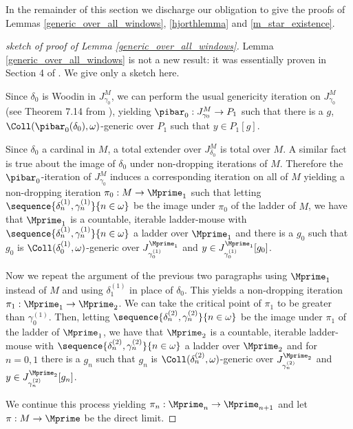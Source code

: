 \documentclass[oneside,12pt]{amsart}
\begin{document}
In the remainder of this section we discharge our obligation to give the proofs of
Lemmas \ref{generic_over_all_windows}, \ref{hjorthlemma} and
\ref{m_star_existence}.

\begin{proof}[sketch of proof of Lemma \ref{generic_over_all_windows}]
Lemma \ref{generic_over_all_windows} is not a new result: it was essentially
proven in Section 4 of \cite{Mouse_Sets}. We give only a sketch here.

Since $\delta_0$ is Woodin in $J^M_{\gamma_0}$,
we can perform the usual genericity iteration on $J^M_{\gamma_0}$
(see Theorem 7.14 from \cite{OutlineOfInnerModelTheory}), yielding
$\pibar_0:J^M_{\gamma_0}\to P_1$ such that
there is a $g$, $\Coll(\pibar_0(\delta_0),\omega)$-generic over $P_1$ such that $y\in P_1[g]$.

Since $\delta_0$ a cardinal in $M$, a total extender over $J^M_{\delta_0}$ is total
over $M$. A similar fact is true about the image of $\delta_0$ under non-dropping
iterations of $M$.
Therefore the $\pibar_0$-iteration of $J^M_{\gamma_0}$ induces a corresponding iteration on all of $M$
yielding a non-dropping iteration $\pi_0:M\to \Mprime_1$ such that
letting $\sequence{\delta^{(1)}_n,\gamma^{(1)}_n}{n\in\omega}$ be the image under $\pi_0$
of the ladder of $M$, we have that $\Mprime_1$ is a countable, iterable ladder-mouse
with $\sequence{\delta^{(1)}_n,\gamma^{(1)}_n}{n\in\omega}$ a ladder over $\Mprime_1$
and there is a $g_0$ such that $g_0$
is $\Coll(\delta^{(1)}_0,\omega)$-generic over
$J^{\Mprime_1}_{\gamma^{(1)}_0}$ and $y\in J^{\Mprime_1}_{\gamma^{(1)}_0}[g_0]$.

Now we repeat the argument of the previous two paragraphs using $\Mprime_1$ instead of $M$
and using $\delta^{(1)}_1$ in place of $\delta_0$. This yields a non-dropping iteration
$\pi_1:\Mprime_1\to\Mprime_2$. We can take the critical point of $\pi_1$ to be
greater than $\gamma^{(1)}_0$. Then,
letting $\sequence{\delta^{(2)}_n,\gamma^{(2)}_n}{n\in\omega}$ be the image under $\pi_1$
of the ladder of $\Mprime_1$, we have that $\Mprime_2$ is a countable, iterable ladder-mouse
with $\sequence{\delta^{(2)}_n,\gamma^{(2)}_n}{n\in\omega}$ a ladder over $\Mprime_2$
and for $n=0,1$ there is a $g_n$ such that $g_n$
is $\Coll(\delta^{(2)}_n,\omega)$-generic over
$J^{\Mprime_2}_{\gamma^{(2)}_n}$ and $y\in J^{\Mprime_2}_{\gamma^{(2)}_n}[g_n]$.

We continue this process yielding $\pi_n:\Mprime_n\to\Mprime_{n+1}$ and
let $\pi:M\to\Mprime$ be the direct limit.

\end{proof}
\end{document}
